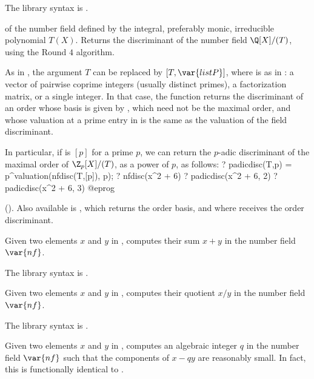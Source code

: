 The library syntax is .

\label{se:nfdisc}
 of the number field defined by the integral,
preferably monic, irreducible polynomial $T(X)$. Returns the discriminant of
the number field $\Q[X]/(T)$, using the Round $4$ algorithm.


As in , the argument $T$ can be replaced by $[T,\var{listP}]$,
where  is as in : a vector of
pairwise coprime integers (usually distinct primes), a factorization matrix,
or a single integer. In that case, the function returns the discriminant of
an order whose basis is given by , which need not be
the maximal order, and whose valuation at a prime entry in  is the
same as the valuation of the field discriminant.

In particular, if  is $[p]$ for a prime $p$, we can
return the $p$-adic discriminant of the maximal order of $\Z_p[X]/(T)$,
as a power of $p$, as follows:
\bprog
? padicdisc(T,p) = p^valuation(nfdisc(T,[p]), p);
? nfdisc(x^2 + 6)
? padicdisc(x^2 + 6, 2)
? padicdisc(x^2 + 6, 3)
@eprog

 (). Also available is
, which returns the order
basis, and where  receives the order discriminant.

\label{se:nfeltadd}
Given two elements $x$ and $y$ in
, computes their sum $x+y$ in the number field $\var{nf}$.

The library syntax is .

\label{se:nfeltdiv}
Given two elements $x$ and $y$ in
, computes their quotient $x/y$ in the number field $\var{nf}$.

The library syntax is .

\label{se:nfeltdiveuc}
Given two elements $x$ and $y$ in
, computes an algebraic integer $q$ in the number field $\var{nf}$
such that the components of $x-qy$ are reasonably small. In fact, this is
functionally identical to .

